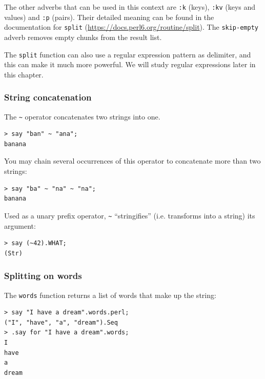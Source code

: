 The other adverbs that can be used in this context are 
{\tt :k} (keys), {\tt :kv} (keys and values) and {\tt :p} 
(pairs). Their detailed meaning can be 
found in the documentation for {\tt split} 
(\url{https://docs.perl6.org/routine/split}). The 
{\tt skip-empty} adverb removes empty chunks from the result 
list.

The {\tt split} function can also use a regular expression 
pattern as delimiter, and this can make it much more powerful. 
We will study regular expressions later in this chapter.

\subsubsection{String concatenation}


The \verb'~' operator concatenates two strings into one.

\begin{verbatim}
> say "ban" ~ "ana";
banana
\end{verbatim}
%

You may chain several occurrences of this operator to 
concatenate more than two strings:

\begin{verbatim}
> say "ba" ~ "na" ~ "na";
banana
\end{verbatim}
%

Used as a unary prefix operator,
\verb'~' ``stringifies'' (i.e. transforms into a string) its argument:

\begin{verbatim}
> say (~42).WHAT;
(Str)
\end{verbatim}
%

\subsubsection{Splitting on words}

The {\tt words} function returns a list of words that make 
up the string:

\begin{verbatim}
> say "I have a dream".words.perl;
("I", "have", "a", "dream").Seq
> .say for "I have a dream".words;
I
have
a
dream
\end{verbatim}
%

